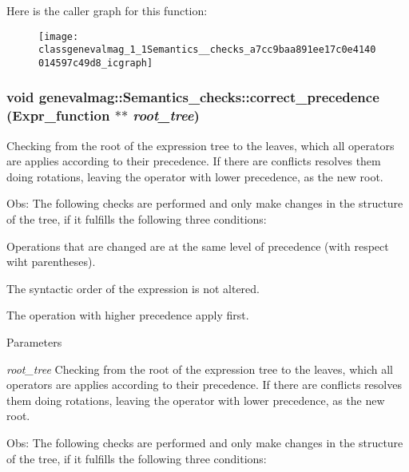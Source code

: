 Here is the caller graph for this function:\nopagebreak
\begin{figure}[H]
\begin{center}
\leavevmode
\texttt{[image: classgenevalmag\_1\_1Semantics\_\_checks\_a7cc9baa891ee17c0e4140014597c49d8\_icgraph]}
\end{center}
\end{figure}


\hypertarget{classgenevalmag_1_1Semantics__checks_a5ad77ec398637204eea7e88b5d4fa74e}{
\subsubsection[{correct\_\-precedence}]{\setlength{\rightskip}{0pt plus 5cm}void genevalmag::Semantics\_\-checks::correct\_\-precedence ({\bf Expr\_\-function} $\ast$$\ast$ {\em root\_\-tree})}}
\label{classgenevalmag_1_1Semantics__checks_a5ad77ec398637204eea7e88b5d4fa74e}
Checking from the root of the expression tree to the leaves, which all operators are applies according to their precedence. If there are conflicts resolves them doing rotations, leaving the operator with lower precedence, as the new root.

Obs: The following checks are performed and only make changes in the structure of the tree, if it fulfills the following three conditions:


\begin{DoxyItemize}
\item Operations that are changed are at the same level of precedence (with respect wiht parentheses).
\item The syntactic order of the expression is not altered.
\item The operation with higher precedence apply first.
\end{DoxyItemize}


\begin{DoxyParams}{Parameters}
\item[{\em root\_\-tree}]Checking from the root of the expression tree to the leaves, which all operators are applies according to their precedence. If there are conflicts resolves them doing rotations, leaving the operator with lower precedence, as the new root.\end{DoxyParams}
Obs: The following checks are performed and only make changes in the structure of the tree, if it fulfills the following three conditions:


